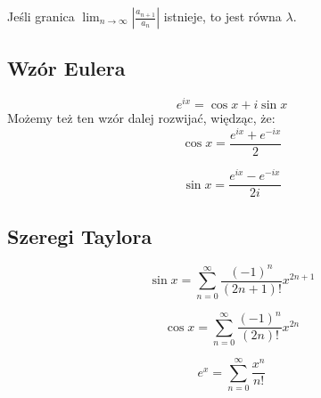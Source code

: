 \documentclass{../notatki}
\begin{document}
Jeśli granica $\lim_{n \to \infty} |\frac{a_{n+1}}{a_n}|$ istnieje,
to jest równa $\lambda$.

\subsection{Wzór Eulera}

$$
e^{ix} = \cos x + i \sin x
$$
Możemy też ten wzór dalej rozwijać, więdząc, że:
$$
\cos x = \frac{e^{ix} + e^{-ix}}{2}
$$

$$
\sin x = \frac{e^{ix} - e^{-ix}}{2i}
$$

\subsection{Szeregi Taylora}

$$
\sin x = \sum_{n=0}^\infty \frac{(-1)^n}{(2n+1)!} x^{2n+1}
$$

$$
\cos x = \sum_{n=0}^\infty \frac{(-1)^n}{(2n)!} x^{2n}
$$

$$
e^x = \sum_{n=0}^\infty \frac{x^n}{n!}
$$
\end{document}
